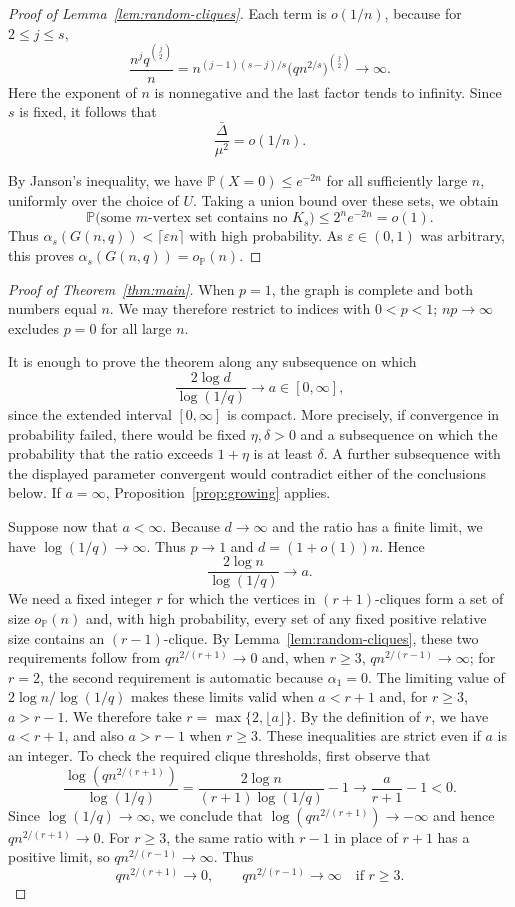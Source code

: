\documentclass[11pt]{article}
\numberwithin{equation}{section}
\newcommand{\Prob}{\mathbb P}
\newcommand{\op}{o_{\mathbb P}}
\begin{document}
\begin{proof}[Proof of Lemma~\ref{lem:random-cliques}]
Each term is $o(1/n)$, because for $2\le j\le s$,
\[
 \frac{n^jq^{\binom j2}}n
 =n^{(j-1)(s-j)/s}
   \bigl(qn^{2/s}\bigr)^{\binom j2}\longrightarrow\infty.
\]
Here the exponent of $n$ is nonnegative and the last factor tends to infinity. Since $s$ is fixed, it follows that
\[
 \frac{\bar\Delta}{\mu^2}=o(1/n).
\]

By Janson's inequality, we have $\Prob(X=0)\le e^{-2n}$ for all sufficiently large $n$, uniformly over the choice of $U$. Taking a union bound over these sets, we obtain
\[
 \Prob\bigl(\text{some $m$-vertex set contains no $K_s$}\bigr)
 \le2^ne^{-2n}=o(1).
\]
Thus $\alpha_s(G(n,q))<\lceil\varepsilon n\rceil$ with high probability. As $\varepsilon\in(0,1)$ was arbitrary, this proves $\alpha_s(G(n,q))=\op(n)$.
\end{proof}

\begin{proof}[Proof of Theorem~\ref{thm:main}]
When $p=1$, the graph is complete and both numbers equal $n$. We may therefore restrict to indices with $0<p<1$; $np\to\infty$ excludes $p=0$ for all large $n$.

It is enough to prove the theorem along any subsequence on which
\[
 \frac{2\log d}{\log(1/q)}\longrightarrow a\in[0,\infty],
\]
since the extended interval $[0,\infty]$ is compact. More precisely, if convergence in probability failed, there would be fixed $\eta,\delta>0$ and a subsequence on which the probability that the ratio exceeds $1+\eta$ is at least $\delta$. A further subsequence with the displayed parameter convergent would contradict either of the conclusions below. If $a=\infty$, Proposition~\ref{prop:growing} applies.

Suppose now that $a<\infty$. Because $d\to\infty$ and the ratio has a finite limit, we have $\log(1/q)\to\infty$. Thus $p\to1$ and $d=(1+o(1))n$. Hence
\[
 \frac{2\log n}{\log(1/q)}\longrightarrow a.
\]
  {We need a fixed integer $r$ for which the vertices in $(r+1)$-cliques form a set of size $\op(n)$ and, with high probability, every set of any fixed positive relative size contains an $(r-1)$-clique. By Lemma~\ref{lem:random-cliques}, these two requirements follow from $qn^{2/(r+1)}\to0$ and, when $r\ge3$, $qn^{2/(r-1)}\to\infty$; for $r=2$, the second requirement is automatic because $\alpha_1=0$. The limiting value of $2\log n/\log(1/q)$ makes these limits valid when $a<r+1$ and, for $r\ge3$, $a>r-1$. We therefore take $r=\max\{2,\lfloor a\rfloor\}$.}
By the definition of $r$, we have $a<r+1$, and also $a>r-1$ when $r\ge3$. These inequalities are strict even if $a$ is an integer. To check the required clique thresholds, first observe that
\[
 \frac{\log(qn^{2/(r+1)})}{\log(1/q)}
 =\frac{2\log n}{(r+1)\log(1/q)}-1
 \longrightarrow\frac{a}{r+1}-1<0.
\]
Since $\log(1/q)\to\infty$, we conclude that $\log(qn^{2/(r+1)})\to-\infty$ and hence $qn^{2/(r+1)}\to0$. For $r\ge3$, the same ratio with $r-1$ in place of $r+1$ has a positive limit, so $qn^{2/(r-1)}\to\infty$. Thus
\begin{equation}\label{eq:window}
 qn^{2/(r+1)}\to0,\qquad
 qn^{2/(r-1)}\to\infty\quad\text{if }r\ge3.
\end{equation}


\end{proof}
\end{document}
